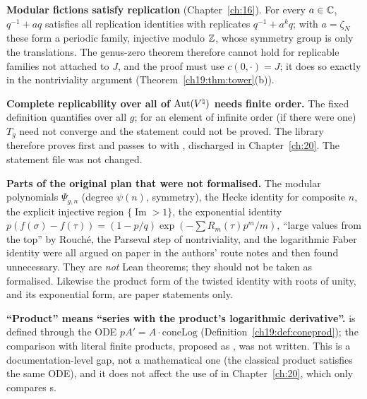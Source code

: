 \begin{warning}
\textbf{Modular fictions satisfy replication} (Chapter~\ref{ch:16}).  For every $a\in{\mathbb{C}}$, $q^{-1}+aq$ satisfies all
replication identities with replicates $q^{-1}+a^kq$; with $a=\zeta_N$ these form a periodic family, injective modulo ${\mathbb{Z}}$, whose symmetry group is
only the translations.  The genus-zero theorem therefore cannot hold for replicable families not attached to $J$, and the proof must use
$c(0,\cdot)=J$; it does so exactly in the nontriviality argument (Theorem~\ref{ch19:thm:tower}(b)).
\end{warning}

\begin{warning}
\textbf{Complete replicability over all of $\operatorname{Aut}({V^{\natural}})$ needs finite order.}  The fixed definition
 quantifies over all $g$; for an element of infinite order (if there were one) $T_g$ need not converge and the
statement could not be proved.  The library therefore proves  first and passes to
 with , discharged in Chapter~\ref{ch:20}.  The statement file was not changed.
\end{warning}

\begin{warning}
\textbf{Parts of the original plan that were not formalised.}  The modular polynomials $\Psi_{g,n}$
(degree $\psi(n)$, symmetry), the Hecke identity for composite $n$, the explicit injective region $\{\operatorname{Im}>1\}$, the exponential identity
$p(f(\sigma)-f(\tau))=(1-p/q)\exp(-\sum R_m(\tau)p^m/m)$, ``large values from the top'' by Rouch\'e, the Parseval step of nontriviality, and the
logarithmic Faber identity were all argued on paper in the authors' route notes and then found unnecessary.  They
are \emph{not} Lean theorems; they should not be taken as formalised.  Likewise the product form of the
twisted identity with roots of unity, and its exponential form, are paper statements only.
\end{warning}

\begin{warning}
\textbf{``Product'' means ``series with the product's logarithmic derivative''.}   is defined through the ODE $pA'=A\cdot
\mathrm{coneLog}$ (Definition~\ref{ch19:def:coneprod}); the comparison with literal finite products, proposed as , was
not written.  This is a documentation-level gap, not a mathematical one (the classical product satisfies the same ODE), and it does not affect the
use of  in Chapter~\ref{ch:20}, which only compares s.
\end{warning}

